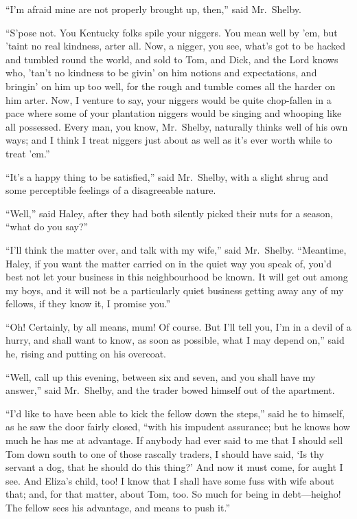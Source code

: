 ``I'm afraid mine are not properly brought up, then,'' said Mr.\ Shelby.

``S'pose not. You Kentucky folks spile your niggers. You mean well by 'em, but
'taint no real kindness, arter all. Now, a nigger, you see, what's got to be
hacked and tumbled round the world, and sold to Tom, and Dick, and the Lord
knows who, 'tan't no kindness to be givin' on him notions and expectations, and
bringin' on him up too well, for the rough and tumble comes all the harder on
him arter. Now, I venture to say, your niggers would be quite chop-fallen in
a pace where some of your plantation niggers would be singing and whooping like
all possessed. Every man, you know, Mr.\ Shelby, naturally thinks well of his
own ways; and I think I treat niggers just about as well as it's ever worth
while to treat 'em.''

``It's a happy thing to be satisfied,'' said Mr.\ Shelby, with a slight shrug
and some perceptible feelings of a disagreeable nature.

``Well,'' said Haley, after they had both silently picked their nuts for
a season, ``what do you say?''

``I'll think the matter over, and talk with my wife,'' said Mr.\ Shelby.
``Meantime, Haley, if you want the matter carried on in the quiet way you speak
of, you'd best not let your business in this neighbourhood be known. It will get
out among my boys, and it will not be a particularly quiet business getting away
any of my fellows, if they know it, I promise you.''

``Oh! Certainly, by all means, mum! Of course. But I'll tell you, I'm in a devil
of a hurry, and shall want to know, as soon as possible, what I may depend on,''
said he, rising and putting on his overcoat.

``Well, call up this evening, between six and seven, and you shall have my
answer,'' said Mr.\ Shelby, and the trader bowed himself out of the apartment.

``I'd like to have been able to kick the fellow down the steps,'' said he to
himself, as he saw the door fairly closed, ``with his impudent assurance; but he
knows how much he has me at advantage. If anybody had ever said to me that
I should sell Tom down south to one of those rascally traders, I should have
said, `Is thy servant a dog, that he should do this thing?' And now it must
come, for aught I see. And Eliza's child, too! I know that I shall have some
fuss with wife about that; and, for that matter, about Tom, too. So much for
being in debt---heigho! The fellow sees his advantage, and means to push it.''

